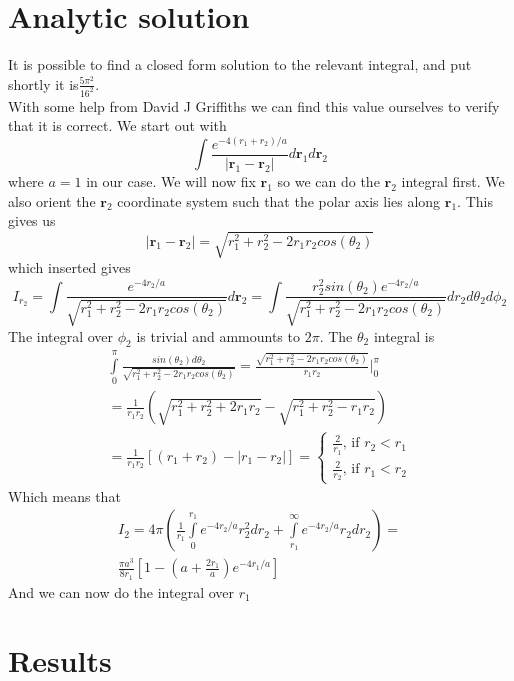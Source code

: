 \documentclass[a4paper,english, 10pt, twoside]{article}
\begin{document}
\section*{Analytic solution}
It is possible to find a closed form solution to the relevant integral, and put shortly it is$\frac{5\pi^2}{16^2}$.\\
With some help from David J Griffiths we can find this value ourselves to verify that it is correct.
We start out with
$$
\int\frac{e^{-4(r_1+r_2)/a}}{\left|\mathbf{r}_1 - \mathbf{r}_2\right|}d\mathbf{r}_1d\mathbf{r}_2
$$
where $a=1$ in our case. We will now fix $\mathbf{r}_1$ so we can do the $\mathbf{r}_2$ integral first. We also orient the 
$\mathbf{r}_2$ coordinate system such that the polar axis lies along $\mathbf{r}_1$. This gives us
$$
\left|\mathbf{r}_1 - \mathbf{r}_2\right| = \sqrt{r_1^2+r_2^2 -2r_1r_2cos(\theta_2)}
$$
which inserted gives
$$
I_{r_2} = \int\frac{e^{-4r_2/a}}{\sqrt{r_1^2+r_2^2 -2r_1r_2cos(\theta_2)}}d\mathbf{r}_2 = 
\int\frac{r_2^2sin(\theta_2)e^{-4r_2/a}}{\sqrt{r_1^2+r_2^2 -2r_1r_2cos(\theta_2)}}dr_2d\theta_2d\phi_2
$$
The integral over $\phi_2$ is trivial and ammounts to $2\pi$. The $\theta_2$ integral is
\begin{align*}
\int\limits_0^\pi\frac{sin(\theta_2)d\theta_2}{\sqrt{r_1^2+r_2^2 -2r_1r_2cos(\theta_2)}} 
= \frac{\sqrt{r_1^2+r_2^2 -2r_1r_2cos(\theta_2)}}{r_1r_2}\Bigg|_0^\pi\\
=\frac{1}{r_1r_2}\left(\sqrt{r_1^2 + r_2^2 +2r_1r_2}-\sqrt{r_1^2+r_2^2 -r_1r_2}\right)\\
=\frac{1}{r_1r_2}[(r_1+r_2)-\left|r_1-r_2\right|] = 
\begin{cases}
\frac{2}{r_1} \text{, if  } r_2<r_1 \\
\frac{2}{r_2} \text{, if  } r_1<r_2
\end{cases}
\end{align*}
Which means that
\begin{align*}
I_2 = 4\pi\left(\frac{1}{r_1}\int\limits_0^{r_1}e^{-4r_2/a}r_2^2dr_2 + \int\limits_{r_1}^\infty e^{-4r_2/a}r_2dr_2\right) = \\
\frac{\pi a^3}{8r_1}\left[1-\left(a+\frac{2r_1}{a}\right)e^{-4r_1/a}\right]
\end{align*}
And we can now do the integral over $r_1$
\section*{Results}
\end{document}
